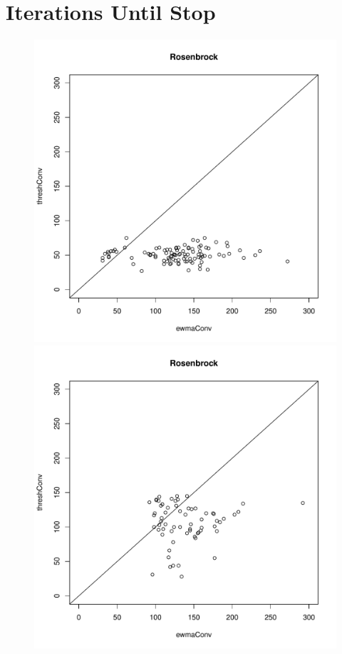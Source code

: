 \documentclass{article}
\begin{document}
\section{\color{red}Iterations Until Stop}
%
\begin{figure}[h!]
	\begin{center}
	\begin{minipage}[h!]{0.32\textwidth}
		\includegraphics[width=1\textwidth]{itConv.pdf}
	\end{minipage}
	\begin{minipage}[h!]{0.32\textwidth}
		\includegraphics[width=1\textwidth]{itConvRast.pdf}
	\end{minipage}
	\end{center}
\end{figure}
\end{document}
